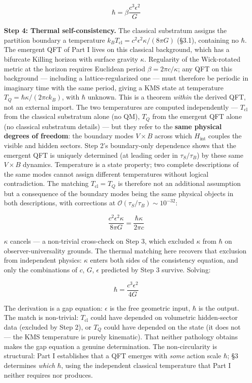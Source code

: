 \documentclass[
]{article}
\begin{document}
\[\hbar = \beta \frac{c^3 \epsilon^2}{G}\]

\textbf{Step 4: Thermal self-consistency.} The classical substratum
assigns the partition boundary a temperature
\(k_B T_{\text{cl}} = c^2 \epsilon^2 \kappa / (8\pi G)\) (§3.1),
containing no \(\hbar\). The emergent QFT of Part I lives on this
classical background, which has a bifurcate Killing horizon with surface
gravity \(\kappa\). Regularity of the Wick-rotated metric at the horizon
requires Euclidean period \(\beta = 2\pi c / \kappa\); any QFT on this
background --- including a lattice-regularized one --- must therefore be
periodic in imaginary time with the same period, giving a KMS state at
temperature \(T_Q = \hbar \kappa / (2\pi c k_B)\), with \(\hbar\)
unknown. This is a theorem \emph{within} the derived QFT, not an
external import. The two temperatures are computed independently ---
\(T_{\text{cl}}\) from the classical substratum alone (no QM), \(T_Q\)
from the emergent QFT alone (no classical substratum details) --- but
they refer to the \textbf{same physical degrees of freedom}: the
boundary modes \(V \times B\) across which \(H_{\text{int}}\) couples
the visible and hidden sectors. Step 2's boundary-only dependence shows
that the emergent QFT is uniquely determined (at leading order in
\(\tau_S/\tau_B\)) by these same \(V \times B\) dynamics. Temperature is
a state property; two complete descriptions of the same modes cannot
assign different temperatures without logical contradiction. The
matching \(T_{\text{cl}} = T_Q\) is therefore not an additional
assumption but a consequence of the boundary modes being the same
physical objects in both descriptions, with corrections at
\(\mathcal{O}(\tau_S/\tau_B) \sim 10^{-32}\):

\[\frac{c^2 \epsilon^2 \kappa}{8\pi G} = \frac{\hbar \kappa}{2\pi c}\]

\(\kappa\) cancels --- a non-trivial cross-check on Step 3, which
excluded \(\kappa\) from \(\hbar\) on observer-universality grounds. The
thermal matching here recovers that exclusion from independent physics:
\(\kappa\) enters both sides of the consistency equation, and only the
combinations of \(c\), \(G\), \(\epsilon\) predicted by Step 3 survive.
Solving:

\[\boxed{\hbar = \frac{c^3 \epsilon^2}{4G}}\]

The derivation is a gap equation: \(\epsilon\) is the free geometric
input, \(\hbar\) is the output. The match is non-trivial:
\(T_{\text{cl}}\) could have depended on volumetric hidden-sector data
(excluded by Step 2), or \(T_Q\) could have depended on the state (it
does not --- the KMS temperature is purely kinematic). That neither
pathology obtains makes the gap equation a genuine determination. The
non-circularity is structural: Part I establishes that a QFT emerges
with \emph{some} action scale \(\hbar\); §3 determines \emph{which}
\(\hbar\), using the independent classical temperature that Part I
neither requires nor produces.
\end{document}
